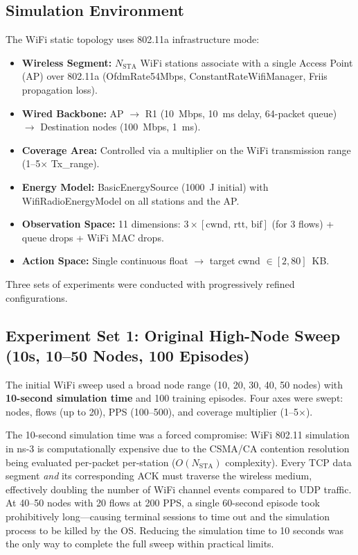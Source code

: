 \documentclass[12pt, a4paper]{article}
\begin{document}
\subsection*{Simulation Environment}

The WiFi static topology uses 802.11a infrastructure mode:

\begin{itemize}
    \item \textbf{Wireless Segment:} $N_{\text{STA}}$ WiFi stations associate with a single Access Point (AP) over 802.11a (OfdmRate54Mbps, ConstantRateWifiManager, Friis propagation loss).
    \item \textbf{Wired Backbone:} AP $\rightarrow$ R1 (10~Mbps, 10~ms delay, 64-packet queue) $\rightarrow$ Destination nodes (100~Mbps, 1~ms).
    \item \textbf{Coverage Area:} Controlled via a multiplier on the WiFi transmission range (1--5$\times$ Tx\_range).
    \item \textbf{Energy Model:} BasicEnergySource (1000~J initial) with WifiRadioEnergyModel on all stations and the AP.
    \item \textbf{Observation Space:} 11 dimensions: $3 \times [\text{cwnd, rtt, bif}]$ (for 3 flows) + queue drops + WiFi MAC drops.
    \item \textbf{Action Space:} Single continuous float $\rightarrow$ target cwnd $\in [2, 80]$~KB.
\end{itemize}

Three sets of experiments were conducted with progressively refined configurations.

\subsection*{Experiment Set 1: Original High-Node Sweep (10s, 10--50 Nodes, 100 Episodes)}

The initial WiFi sweep used a broad node range (10, 20, 30, 40, 50 nodes) with \textbf{10-second simulation time} and 100 training episodes. Four axes were swept: nodes, flows (up to 20), PPS (100--500), and coverage multiplier (1--5$\times$).

The 10-second simulation time was a forced compromise: WiFi 802.11 simulation in ns-3 is computationally expensive due to the CSMA/CA contention resolution being evaluated per-packet per-station ($O(N_\text{STA})$ complexity). Every TCP data segment \textit{and} its corresponding ACK must traverse the wireless medium, effectively doubling the number of WiFi channel events compared to UDP traffic. At 40--50 nodes with 20 flows at 200 PPS, a single 60-second episode took prohibitively long---causing terminal sessions to time out and the simulation process to be killed by the OS. Reducing the simulation time to 10 seconds was the only way to complete the full sweep within practical limits.
\end{document}
